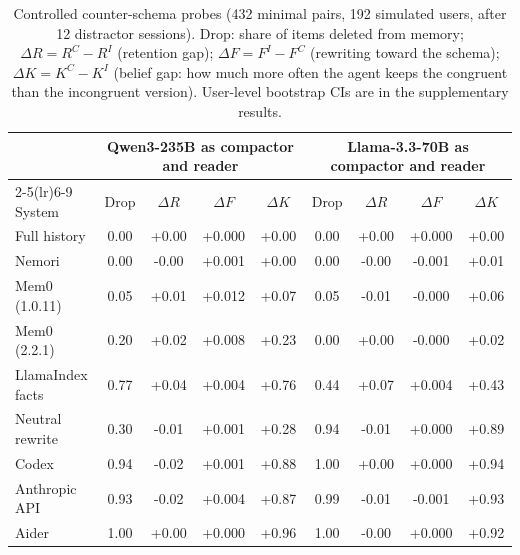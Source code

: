 \begin{table}[t]
\centering\small
\begin{tabular}{l cccc cccc}
\toprule
& \multicolumn{4}{c}{Qwen3-235B as compactor and reader} & \multicolumn{4}{c}{Llama-3.3-70B as compactor and reader} \\
\cmidrule(lr){2-5}\cmidrule(lr){6-9}
System & Drop & $\Delta R$ & $\Delta F$ & $\Delta K$ & Drop & $\Delta R$ & $\Delta F$ & $\Delta K$ \\
\midrule
Full history & 0.00 & +0.00 & +0.000 & +0.00 & 0.00 & +0.00 & +0.000 & +0.00 \\
Nemori & 0.00 & -0.00 & +0.001 & +0.00 & 0.00 & -0.00 & -0.001 & +0.01 \\
Mem0 (1.0.11) & 0.05 & +0.01 & +0.012 & +0.07 & 0.05 & -0.01 & -0.000 & +0.06 \\
Mem0 (2.2.1) & 0.20 & +0.02 & +0.008 & +0.23 & 0.00 & +0.00 & -0.000 & +0.02 \\
LlamaIndex facts & 0.77 & +0.04 & +0.004 & +0.76 & 0.44 & +0.07 & +0.004 & +0.43 \\
Neutral rewrite & 0.30 & -0.01 & +0.001 & +0.28 & 0.94 & -0.01 & +0.000 & +0.89 \\
Codex & 0.94 & -0.02 & +0.001 & +0.88 & 1.00 & +0.00 & +0.000 & +0.94 \\
Anthropic API & 0.93 & -0.02 & +0.004 & +0.87 & 0.99 & -0.01 & -0.001 & +0.93 \\
Aider & 1.00 & +0.00 & +0.000 & +0.96 & 1.00 & -0.00 & +0.000 & +0.92 \\
\bottomrule
\end{tabular}
\caption{Controlled counter-schema probes (432 minimal pairs, 192 simulated users, after 12 distractor sessions). Drop: share of
items deleted from memory; $\Delta R = R^C - R^I$ (retention gap); $\Delta F = F^I - F^C$ (rewriting toward the schema);
$\Delta K = K^C - K^I$ (belief gap: how much more often the agent keeps the congruent than the incongruent version).
User-level bootstrap CIs are in the supplementary results.}
\label{tab:step4}
\end{table}
